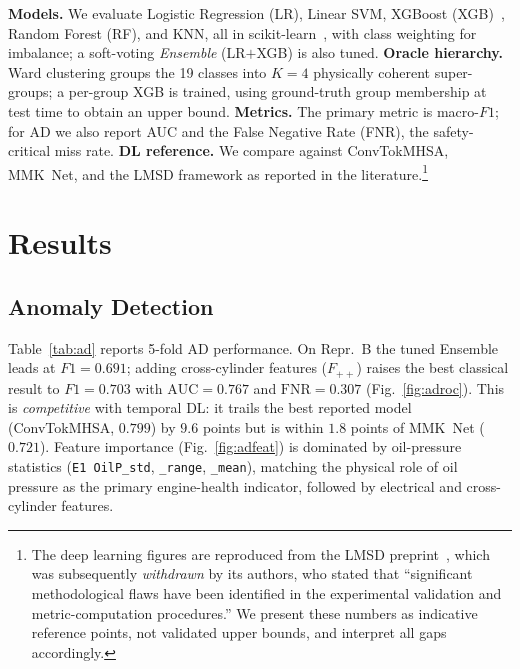 \documentclass[conference]{IEEEtran}
\begin{document}
\textbf{Models.} We evaluate Logistic Regression (LR), Linear SVM, XGBoost
(XGB)~\cite{xgboost2016}, Random Forest (RF), and KNN, all in
scikit-learn~\cite{sklearn2011}, with class weighting for imbalance; a soft-voting
\emph{Ensemble} (LR$+$XGB) is also tuned. \textbf{Oracle hierarchy.} Ward
clustering groups the 19 classes into $K{=}4$ physically coherent super-groups; a
per-group XGB is trained, using ground-truth group membership at test time to
obtain an upper bound. \textbf{Metrics.} The primary metric is macro-$F1$; for AD
we also report AUC and the False Negative Rate (FNR), the safety-critical miss
rate. \textbf{DL reference.} We compare against ConvTokMHSA, MMK~Net, and the LMSD
framework as reported in the literature.\footnote{The deep learning figures are
reproduced from the LMSD preprint~\cite{lmsd2025}, which was subsequently
\emph{withdrawn} by its authors, who stated that ``significant methodological
flaws have been identified in the experimental validation and metric-computation
procedures.'' We present these numbers as indicative reference points, not
validated upper bounds, and interpret all gaps accordingly.}

\section{Results}
\label{sec:results}

\subsection{Anomaly Detection}
Table~\ref{tab:ad} reports 5-fold AD performance. On Repr.~B the tuned Ensemble
leads at $F1=0.691$; adding cross-cylinder features ($F_{++}$) raises the best
classical result to $F1=0.703$ with $\text{AUC}=0.767$ and $\text{FNR}=0.307$
(Fig.~\ref{fig:adroc}). This is \emph{competitive} with temporal DL: it trails the
best reported model (ConvTokMHSA, $0.799$) by $9.6$ points but is within $1.8$
points of MMK~Net ($0.721$). Feature importance (Fig.~\ref{fig:adfeat}) is
dominated by oil-pressure statistics (\texttt{E1 OilP\_std}, \texttt{\_range},
\texttt{\_mean}), matching the physical role of oil pressure as the primary
engine-health indicator, followed by electrical and cross-cylinder features.
\end{document}
